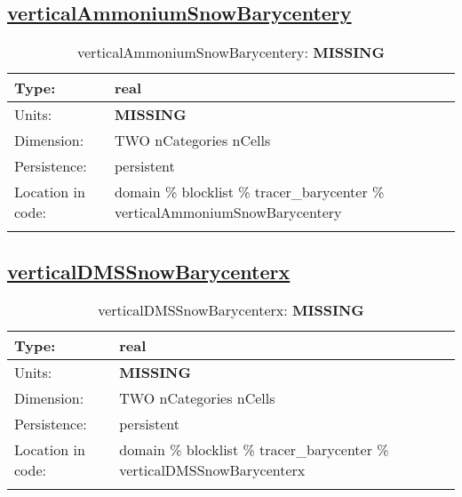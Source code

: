 \subsection[verticalAmmoniumSnowBarycentery]{\hyperref[sec:var_tab_tracer_barycenter]{verticalAmmoniumSnowBarycentery}}
\label{subsec:var_sec_tracer_barycenter_verticalAmmoniumSnowBarycentery}
\begin{center}
\begin{longtable}{| p{2.0in} | p{4.0in} |}
        \hline 
        Type: & real \\
        \hline 
        Units: & {\bf \color{red} MISSING} \\
        \hline 
        Dimension: & TWO nCategories nCells \\
        \hline 
        Persistence: & persistent \\
        \hline 
         Location in code: & domain \% blocklist \% tracer\_barycenter \% verticalAmmoniumSnowBarycentery \\
         \hline 
    \caption{verticalAmmoniumSnowBarycentery: {\bf \color{red} MISSING}}
\end{longtable}
\end{center}
\subsection[verticalDMSSnowBarycenterx]{\hyperref[sec:var_tab_tracer_barycenter]{verticalDMSSnowBarycenterx}}
\label{subsec:var_sec_tracer_barycenter_verticalDMSSnowBarycenterx}
\begin{center}
\begin{longtable}{| p{2.0in} | p{4.0in} |}
        \hline 
        Type: & real \\
        \hline 
        Units: & {\bf \color{red} MISSING} \\
        \hline 
        Dimension: & TWO nCategories nCells \\
        \hline 
        Persistence: & persistent \\
        \hline 
         Location in code: & domain \% blocklist \% tracer\_barycenter \% verticalDMSSnowBarycenterx \\
         \hline 
    \caption{verticalDMSSnowBarycenterx: {\bf \color{red} MISSING}}
\end{longtable}
\end{center}
